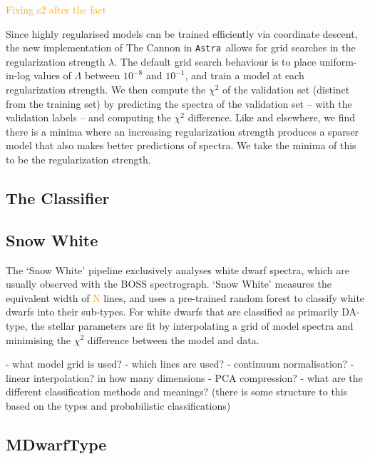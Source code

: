 \documentclass[modern]{aastex631}
\newcommand{\astra}{\texttt{Astra}}
\newcommand{\todo}[1]{\textcolor{orange}{#1}}
\begin{document}
\todo{Fixing s2 after the fact}

Since highly regularised models can be trained efficiently via coordinate descent, the new implementation of The Cannon in \astra\ allows for grid searches in the regularization strength $\lambda$. The default grid search behaviour is to place uniform-in-log values of $\Lambda$ between $10^{-8}$ and $10^{-1}$, and train a model at each regularization strength. We then compute the $\chi^2$ of the validation set (distinct from the training set) by predicting the spectra of the validation set -- with the validation labels -- and computing the $\chi^2$ difference. Like \citet{Casey} and elsewhere, we find there is a minima where an increasing regularization strength produces a sparser model that also makes better predictions of spectra. We take the minima of this to be the regularization strength. 



\subsection{The Classifier} \label{sec:methods-the-classifier}


\subsection{Snow White} \label{sec:methods-snow-white}

The `Snow White' pipeline exclusively analyses white dwarf spectra, which are usually observed with the BOSS 
spectrograph. %
`Snow White' measures the equivalent width of \todo{N} lines, and uses a pre-trained random forest \citep{RF} to classify white dwarfs into their sub-types. For white dwarfs that are classified as primarily DA-type, the stellar parameters are fit by interpolating a grid of \citep{who} model spectra and minimising the $\chi^2$ difference between the model and data.

- what model grid is used?
- which lines are used?
- continuum normalisation?
- linear interpolation? in how many dimensions
- PCA compression?
- what are the different classification methods and meanings? (there is some structure to this based on the types and probabilistic classifications)

\subsection{MDwarfType} \label{sec:methods-m-dwarf-type}
\end{document}
